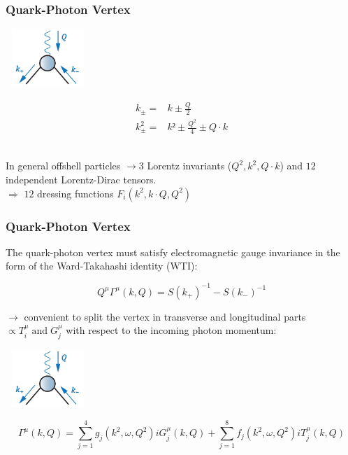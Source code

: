 \begin{frame}\frametitle{Quark-Photon Vertex}
\begin{minipage}[r]{0.49\textwidth}
	\hspace{2mm}	
	\includegraphics[height=2.2cm, width=3.2cm]{Vertex.png}
\end{minipage}
%
\begin{minipage}[r]{0.49\textwidth}
\begin{align}
k_{\pm} =& k \pm \frac{Q}{2} \\\nonumber
k_{\pm}^2=& k² \pm \frac{Q^2}{4} \pm Q\cdot k
\end{align}
\end{minipage}\\
%
\vspace{3mm}
%
In general offshell  particles $\rightarrow 3$ Lorentz invariants ($Q^2, k^2, Q\cdot k$) and $12$ independent Lorentz-Dirac tensors.\\
\vspace{3mm}
$\Rightarrow$ $12$ dressing functions $F_i(k^2, k\cdot Q, Q^2)$
\end{frame}

\begin{frame}\frametitle{Quark-Photon Vertex}
The quark-photon vertex must satisfy electromagnetic gauge invariance in the form of the
Ward-Takahashi identity (WTI):

\begin{equation}
	Q^\mu\Gamma^\mu(k, Q)=S(k_+)^{-1}-S(k_-)^{-1}
\end{equation}

\begin{minipage}[r]{0.65\textwidth}
	$\rightarrow$ convenient to split the vertex in transverse and longitudinal parts $\propto T_i^{\mu} \; \text{and} \;  G_j^{\mu} $ with respect to the incoming photon momentum:
\end{minipage}
\begin{minipage}[r]{0.30\textwidth}
	\hspace{2mm}	
	\includegraphics[height=2.2cm, width=3.2cm]{Vertex.png}
\end{minipage}


\begin{equation}
	\Gamma^\mu(k,Q)=\sum_{j=1}^4 g_j(k^2, \omega, Q^2)iG^\mu_j(k, Q)+\sum_{j=1}^8 f_j(k^2, \omega, Q^2)iT^\mu_j(k, Q)
\end{equation}


\end{frame}



